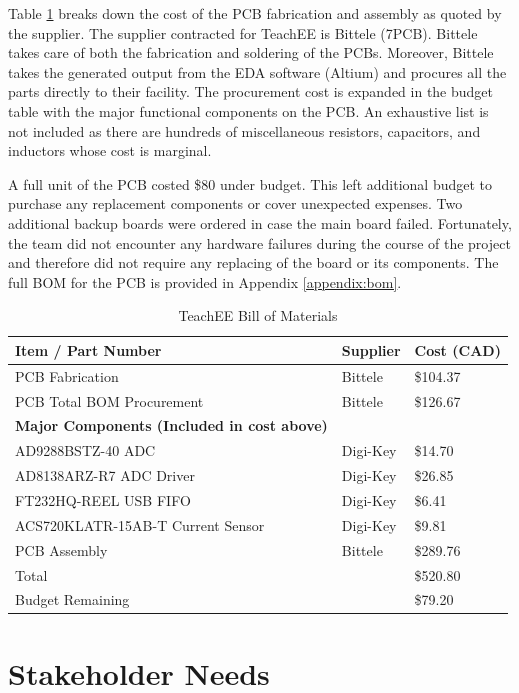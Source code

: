 \documentclass[letterpaper,11pt]{article}
\begin{document}
Table \ref{tab:abbreviated-bom} breaks down the cost of the PCB
fabrication and assembly as quoted by the supplier. The supplier contracted for
TeachEE is Bittele (7PCB). Bittele takes care of both the fabrication and
soldering of the PCBs. Moreover, Bittele takes the generated output from the EDA
software (Altium) and procures all the parts directly to their facility. The
procurement cost is expanded in the budget table with the major functional
components on the PCB. An exhaustive list is not included as there are hundreds
of miscellaneous resistors, capacitors, and inductors whose cost is marginal.

A full unit of the PCB costed \$80 under budget. This left
additional budget to purchase any replacement components or
cover unexpected expenses. Two additional backup boards were ordered in case the main
board failed. Fortunately, the team did not encounter any hardware failures during the
course of the project and therefore did not require any replacing of the board or its
components. The full BOM for the PCB is provided in Appendix \ref{appendix:bom}.

\begin{table}[H]
    \caption{TeachEE Bill of Materials}
    \begin{tabularx}{\textwidth}{l|l|l}
        \textbf{Item / Part Number} & \textbf{Supplier} & \textbf{Cost (CAD)} \\
        \hline
        PCB Fabrication & Bittele & \$104.37\\
        PCB Total BOM Procurement & Bittele & \$126.67\\
        \hline
        \textbf{Major Components (Included in cost above)}& &\\
        \hline
        AD9288BSTZ-40 ADC & Digi-Key & \$14.70\\
        AD8138ARZ-R7 ADC Driver & Digi-Key & \$26.85\\
        FT232HQ-REEL USB FIFO & Digi-Key & \$6.41\\
        ACS720KLATR-15AB-T Current Sensor & Digi-Key & \$9.81\\
        \hline
        PCB Assembly & Bittele & \$289.76\\
        \hline
        Total & & \$520.80\\
        \hline
        Budget Remaining & & \$79.20
    \end{tabularx} 
\label{tab:abbreviated-bom}
\end{table}

\section{Stakeholder Needs} \label{sec:stakeholder-needs} %
\end{document}
